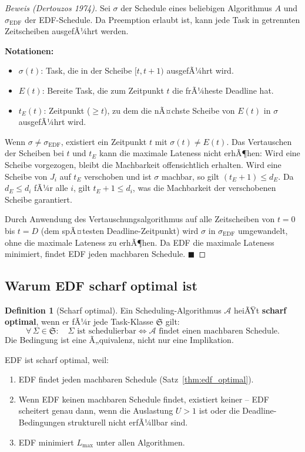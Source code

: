 ﻿\documentclass[a4paper,12pt]{report}
\theoremstyle{definition}
\newtheorem{definition}{Definition}[chapter]
\begin{document}
\begin{proof}[Beweis (Dertouzos 1974)]
	Sei $\sigma$ der Schedule eines beliebigen Algorithmus $A$ und $\sigma_{\text{EDF}}$
	der EDF-Schedule. Da Preemption erlaubt ist, kann jede Task in getrennten
	Zeitscheiben ausgefÃ¼hrt werden.

	\textbf{Notationen:}
	\begin{itemize}
		\item $\sigma(t)$: Task, die in der Scheibe $[t, t+1)$ ausgefÃ¼hrt wird.
		\item $E(t)$: Bereite Task, die zum Zeitpunkt $t$ die frÃ¼heste Deadline hat.
		\item $t_E(t)$: Zeitpunkt ($\geq t$), zu dem die nÃ¤chste Scheibe von $E(t)$
		      in $\sigma$ ausgefÃ¼hrt wird.
	\end{itemize}

	Wenn $\sigma \neq \sigma_{\text{EDF}}$, existiert ein Zeitpunkt $t$ mit
	$\sigma(t) \neq E(t)$. Das Vertauschen der Scheiben bei $t$ und $t_E$ kann die
	maximale Lateness nicht erhÃ¶hen: Wird eine Scheibe vorgezogen, bleibt die
	Machbarkeit offensichtlich erhalten. Wird eine Scheibe von $J_i$ auf $t_E$
	verschoben und ist $\sigma$ machbar, so gilt $(t_E + 1) \leq d_E$. Da
	$d_E \leq d_i$ fÃ¼r alle $i$, gilt $t_E + 1 \leq d_i$, was die Machbarkeit
	der verschobenen Scheibe garantiert.

	Durch Anwendung des Vertauschungsalgorithmus auf alle Zeitscheiben von $t=0$
	bis $t=D$ (dem spÃ¤testen Deadline-Zeitpunkt) wird $\sigma$ in $\sigma_{\text{EDF}}$
	umgewandelt, ohne die maximale Lateness zu erhÃ¶hen. Da EDF die maximale
	Lateness minimiert, findet EDF jeden machbaren Schedule. \hfill$\blacksquare$
\end{proof}

\subsection{Warum EDF scharf optimal ist}

\begin{definition}[Scharf optimal]
	Ein Scheduling-Algorithmus $\mathcal{A}$ heiÃŸt \textbf{scharf optimal}, wenn er
	fÃ¼r jede Task-Klasse $\mathfrak{S}$ gilt:
	\[
		\forall\, \Sigma \in \mathfrak{S}: \quad
		\Sigma \text{ ist schedulierbar} \iff \mathcal{A} \text{ findet einen machbaren Schedule.}
	\]
	Die Bedingung ist eine Ã„quivalenz, nicht nur eine Implikation.
\end{definition}

EDF ist scharf optimal, weil:
\begin{enumerate}
	\item EDF findet jeden machbaren Schedule (Satz~\ref{thm:edf_optimal}).
	\item Wenn EDF keinen machbaren Schedule findet, existiert keiner -- EDF scheitert
	      genau dann, wenn die Auslastung $U > 1$ ist oder die Deadline-Bedingungen
	      strukturell nicht erfÃ¼llbar sind.
	\item EDF minimiert $L_{\max}$ unter allen Algorithmen.
\end{enumerate}
\end{document}
